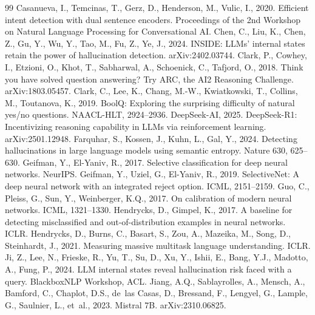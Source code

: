 \documentclass[preprint,12pt,authoryear]{elsarticle}
\begin{document}
\begin{thebibliography}{99}
 Casanueva, I., Temcinas, T., Gerz, D., Henderson, M., Vulic, I., 2020. Efficient intent detection with dual sentence encoders. Proceedings of the 2nd Workshop on Natural Language Processing for Conversational AI.
 Chen, C., Liu, K., Chen, Z., Gu, Y., Wu, Y., Tao, M., Fu, Z., Ye, J., 2024. INSIDE: LLMs' internal states retain the power of hallucination detection. arXiv:2402.03744.
 Clark, P., Cowhey, I., Etzioni, O., Khot, T., Sabharwal, A., Schoenick, C., Tafjord, O., 2018. Think you have solved question answering? Try ARC, the AI2 Reasoning Challenge. arXiv:1803.05457.
 Clark, C., Lee, K., Chang, M.-W., Kwiatkowski, T., Collins, M., Toutanova, K., 2019. BoolQ: Exploring the surprising difficulty of natural yes/no questions. NAACL-HLT, 2924--2936.
 DeepSeek-AI, 2025. DeepSeek-R1: Incentivizing reasoning capability in LLMs via reinforcement learning. arXiv:2501.12948.
 Farquhar, S., Kossen, J., Kuhn, L., Gal, Y., 2024. Detecting hallucinations in large language models using semantic entropy. Nature 630, 625--630.
 Geifman, Y., El-Yaniv, R., 2017. Selective classification for deep neural networks. NeurIPS.
 Geifman, Y., Uziel, G., El-Yaniv, R., 2019. SelectiveNet: A deep neural network with an integrated reject option. ICML, 2151--2159.
 Guo, C., Pleiss, G., Sun, Y., Weinberger, K.Q., 2017. On calibration of modern neural networks. ICML, 1321--1330.
 Hendrycks, D., Gimpel, K., 2017. A baseline for detecting misclassified and out-of-distribution examples in neural networks. ICLR.
 Hendrycks, D., Burns, C., Basart, S., Zou, A., Mazeika, M., Song, D., Steinhardt, J., 2021. Measuring massive multitask language understanding. ICLR.
 Ji, Z., Lee, N., Frieske, R., Yu, T., Su, D., Xu, Y., Ishii, E., Bang, Y.J., Madotto, A., Fung, P., 2024. LLM internal states reveal hallucination risk faced with a query. BlackboxNLP Workshop, ACL.
 Jiang, A.Q., Sablayrolles, A., Mensch, A., Bamford, C., Chaplot, D.S., de~las Casas, D., Bressand, F., Lengyel, G., Lample, G., Saulnier, L., et~al., 2023. Mistral 7B. arXiv:2310.06825.

\end{thebibliography}
\end{document}
